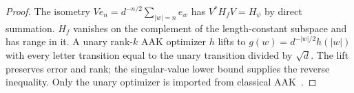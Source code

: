\begin{proof}
The isometry $Ve_n=d^{-n/2}\sum_{|w|=n}e_w$ has $V^*H_fV=H_\psi$ by direct summation. $H_f$ vanishes on the complement of the length-constant subspace and has range in it. A unary rank-$k$ AAK optimizer $h$ lifts to $g(w)=d^{-|w|/2}h(|w|)$ with every letter transition equal to the unary transition divided by $\sqrt d$. The lift preserves error and rank; the singular-value lower bound supplies the reverse inequality. Only the unary optimizer is imported from classical AAK~\cite{lacroce2024}.
\end{proof}
